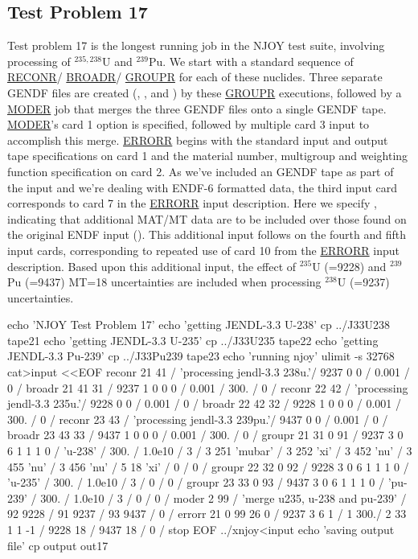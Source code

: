 \subsection{Test Problem 17}
\label{ssMandT_17}

Test problem 17 is the longest running job in the NJOY test suite,
involving processing of $^{235,238}$U and $^{239}$Pu.  We start with
a standard sequence of \hyperlink{sRECONRhy}{RECONR}/
\hyperlink{sBROADRhy}{BROADR}/
\hyperlink{sGROUPRhy}{GROUPR} for each of these nuclides.
Three separate GENDF files are created (, ,
and ) by these \hyperlink{sGROUPRhy}{GROUPR}
executions, followed by a \hyperlink{sMODERhy}{MODER}
job that merges the three GENDF files onto a single GENDF
tape.  \hyperlink{sMODERhy}{MODER}'s
card 1  option is specified, followed by multiple card 3
input to accomplish this merge.  \hyperlink{sERRORRhy}{ERRORR}
begins with the standard input
and output tape specifications on card 1 and the material number,
multigroup and weighting function specification on card 2.  As we've
included an GENDF tape as part of the input and we're dealing with
ENDF-6 formatted data, the third input card corresponds to card 7 in
the \hyperlink{sERRORRhy}{ERRORR} input description.  Here we
specify , indicating that additional MAT/MT data are
to be included over those found on the original ENDF input
().  This additional input follows on the fourth
and fifth input cards, corresponding to repeated use of card 10
from the \hyperlink{sERRORRhy}{ERRORR} input description.  Based upon
this additional input, the effect of $^{235}$U (=9228) and
$^{239}$Pu (=9437) MT=18 uncertainties are included when processing
$^{238}$U (=9237) uncertainties.

\small
\begin{ccode}

echo 'NJOY Test Problem 17'
echo 'getting JENDL-3.3 U-238'
cp ../J33U238 tape21
echo 'getting JENDL-3.3 U-235'
cp ../J33U235 tape22
echo 'getting JENDL-3.3 Pu-239'
cp ../J33Pu239 tape23
echo 'running njoy'
ulimit -s 32768
cat>input <<EOF
 reconr
 21 41 /
 'processing jendl-3.3 238u.'/
 9237 0 0 /
 0.001 /
 0 /
 broadr
 21 41 31 /
 9237 1 0 0 0 /
 0.001 /
 300. /
 0 /
 reconr
 22 42 /
 'processing jendl-3.3 235u.'/
 9228 0 0 /
 0.001 /
 0 /
 broadr
 22 42 32 /
 9228 1 0 0 0 /
 0.001 /
 300. /
 0 /
 reconr
 23 43 /
 'processing jendl-3.3 239pu.'/
 9437 0 0 /
 0.001 /
 0 /
 broadr
 23 43 33 /
 9437 1 0 0 0 /
 0.001 /
 300. /
 0 /
 groupr
 21 31 0 91 /
 9237 3 0 6 1 1 1 0 /
 'u-238' /
 300. /
 1.0e10 /
 3 /
 3 251 'mubar' /
 3 252 'xi' /
 3 452 'nu' /
 3 455 'nu' /
 3 456 'nu' /
 5 18  'xi' /
 0 /
 0 /
 groupr
 22 32 0 92 /
 9228 3 0 6 1 1 1 0 /
 'u-235' /
 300. /
 1.0e10 /
 3 /
 0 /
 0 /
 groupr
 23 33 0 93 /
 9437 3 0 6 1 1 1 0 /
 'pu-239' /
 300. /
 1.0e10 /
 3 /
 0 /
 0 /
 moder
 2 99 /
 'merge u235, u-238 and pu-239' /
 92  9228 /
 91  9237 /
 93  9437 /
 0 /
 errorr
 21 0 99 26 0 /
 9237 3 6 1 /
 1 300./
 2 33 1 1 -1 /
 9228 18 /
 9437 18 /
 0 /
stop
EOF
../xnjoy<input
echo 'saving output file'
cp output out17

\end{ccode}
\normalsize

